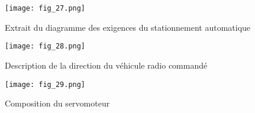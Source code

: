 \begin{figure}[H]
\centering
\texttt{[image: fig\_27.png]}
\caption{Extrait du diagramme des exigences du stationnement automatique \label{fig_27}}
\end{figure}


\begin{figure}[H]
\centering
\texttt{[image: fig\_28.png]}
\caption{Description de la direction du véhicule radio commandé \label{fig_28}}
\end{figure}


\begin{figure}[H]
\centering
\texttt{[image: fig\_29.png]}
\caption{Composition du servomoteur \label{fig_29}}
\end{figure}
